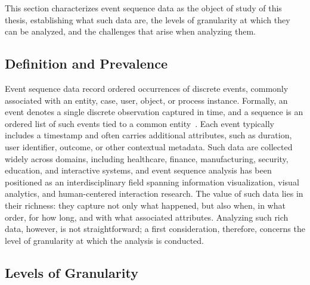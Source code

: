 This section characterizes event sequence data as the object of study of this thesis, establishing what such data are, the levels of granularity at which they can be analyzed, and the challenges that arise when analyzing them.



\subsection{Definition and Prevalence}

Event sequence data record ordered occurrences of discrete events, commonly associated with an entity, case, user, object, or process instance.
Formally, an event denotes a single discrete observation captured in time, and a sequence is an ordered list of such events tied to a common entity~\cite{guo2022survey}.
Each event typically includes a timestamp and often carries additional attributes, such as duration, user identifier, outcome, or other contextual metadata.
Such data are collected widely across domains, including healthcare, finance, manufacturing, security, education, and interactive systems, and event sequence analysis has been positioned as an interdisciplinary field spanning information visualization, visual analytics, and human-centered interaction research.
The value of such data lies in their richness: they capture not only what happened, but also when, in what order, for how long, and with what associated attributes.
Analyzing such rich data, however, is not straightforward; a first consideration, therefore, concerns the level of granularity at which the analysis is conducted.



\subsection{Levels of Granularity}

